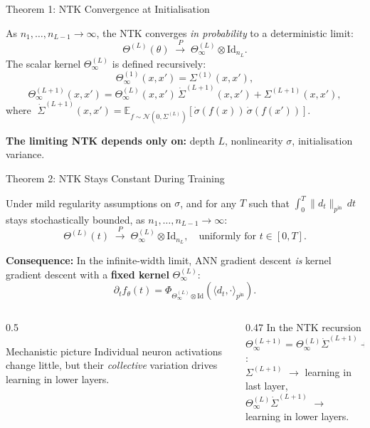 \documentclass[aspectratio=169, 10pt]{beamer}
\newcommand{\NTK}{\Theta^{(L)}_\infty}
\newcommand{\E}{\mathbb{E}}
\newcommand{\pin}{p^{\mathrm{in}}}
\newcommand{\fth}{f_\theta}
\newcommand{\highlight}[1]{\textcolor{blue!70!black}{\textbf{#1}}}
\begin{document}
\begin{frame}{Theorem 1: NTK Convergence at Initialisation}
  \begin{theorem}
    As $n_1,\ldots,n_{L-1}\to\infty$, the NTK converges \emph{in probability} to a deterministic limit:
    \[
      \Theta^{(L)}(\theta) \;\xrightarrow{\;P\;}\; \NTK \otimes \mathrm{Id}_{n_L}.
    \]
    The scalar kernel $\NTK$ is defined recursively:
    \[
      \Theta^{(1)}_\infty(x,x') = \Sigma^{(1)}(x,x'),
    \]
    \[
      \Theta^{(L+1)}_\infty(x,x') = \Theta^{(L)}_\infty(x,x')\,\dot\Sigma^{(L+1)}(x,x') + \Sigma^{(L+1)}(x,x'),
    \]
    where $\;\dot\Sigma^{(L+1)}(x,x') = \E_{f\sim\mathcal{N}(0,\Sigma^{(L)})}\!\left[\dot\sigma(f(x))\,\dot\sigma(f(x'))\right]$.
  \end{theorem}

  \vspace{0.3em}
  \textbf{The limiting NTK depends only on:} depth $L$, nonlinearity $\sigma$, initialisation variance.
\end{frame}

\begin{frame}{Theorem 2: NTK Stays Constant During Training}
  \begin{theorem}
    Under mild regularity assumptions on $\sigma$, and for any $T$ such that $\int_0^T \|d_t\|_{\pin}\,dt$ stays stochastically bounded, as $n_1,\ldots,n_{L-1}\to\infty$:
    \[
      \Theta^{(L)}(t) \;\xrightarrow{\;P\;}\; \NTK \otimes \mathrm{Id}_{n_L}, \quad \text{uniformly for } t\in[0,T].
    \]
  \end{theorem}

  \vspace{0.3em}
  \textbf{Consequence:} In the infinite-width limit, ANN gradient descent \emph{is} kernel gradient descent with a \highlight{fixed kernel} $\NTK$:
  \[
    \partial_t \fth(t) = \Phi_{\NTK\otimes\mathrm{Id}}\!\left(\langle d_t, \cdot\rangle_{\pin}\right).
  \]

  \begin{columns}[T]
    \begin{column}{0.5\textwidth}
      \begin{alertblock}{Mechanistic picture}
        Individual neuron activations change little, but their \emph{collective} variation drives learning in lower layers.
      \end{alertblock}
    \end{column}
    \begin{column}{0.47\textwidth}
      \small
      In the NTK recursion $\Theta^{(L+1)}_\infty = \Theta^{(L)}_\infty\dot\Sigma^{(L+1)} + \Sigma^{(L+1)}$:\\[2pt]
      $\Sigma^{(L+1)}$ $\to$ learning in last layer,\\
      $\Theta^{(L)}_\infty\dot\Sigma^{(L+1)}$ $\to$ learning in lower layers.
    \end{column}
  \end{columns}
\end{frame}
\end{document}
